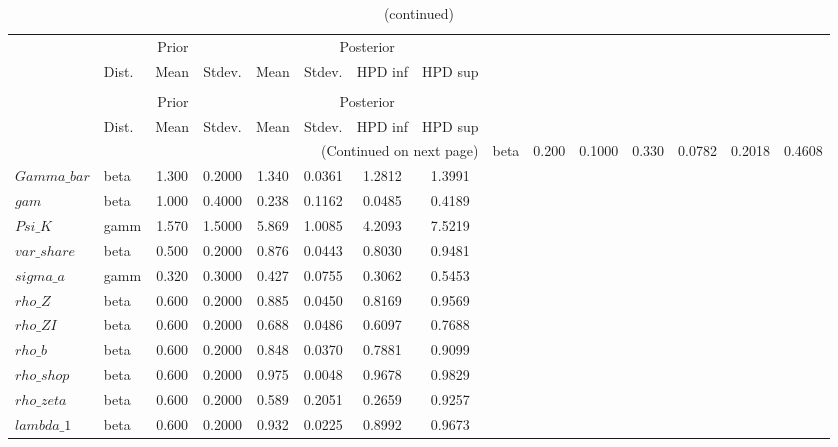  
\begin{center}
\begin{longtable}{llcccccc} 
\caption{Results from Metropolis-Hastings (parameters)}
 \label{Table:MHPosterior:1}\\
\toprule 
  & \multicolumn{3}{c}{Prior}  &  \multicolumn{4}{c}{Posterior} \\
  \cmidrule(r{.75em}){2-4} \cmidrule(r{.75em}){5-8}
  & Dist. & Mean  & Stdev. & Mean & Stdev. & HPD inf & HPD sup\\
\midrule \endfirsthead 
\caption{(continued)}\\\toprule 
  & \multicolumn{3}{c}{Prior}  &  \multicolumn{4}{c}{Posterior} \\
  \cmidrule(r{.75em}){2-4} \cmidrule(r{.75em}){5-8}
  & Dist. & Mean  & Stdev. & Mean & Stdev. & HPD inf & HPD sup\\
\midrule \endhead 
\bottomrule \multicolumn{8}{r}{(Continued on next page)} \endfoot 
\bottomrule \endlastfoot 
$Psi$ & beta &   0.200 & 0.1000 &   0.330& 0.0782 &  0.2018 &  0.4608 \\ 
$Gamma\_bar$ & beta &   1.300 & 0.2000 &   1.340& 0.0361 &  1.2812 &  1.3991 \\ 
$gam$ & beta &   1.000 & 0.4000 &   0.238& 0.1162 &  0.0485 &  0.4189 \\ 
$Psi\_K$ & gamm &   1.570 & 1.5000 &   5.869& 1.0085 &  4.2093 &  7.5219 \\ 
$var\_share$ & beta &   0.500 & 0.2000 &   0.876& 0.0443 &  0.8030 &  0.9481 \\ 
$sigma\_a$ & gamm &   0.320 & 0.3000 &   0.427& 0.0755 &  0.3062 &  0.5453 \\ 
$rho\_Z$ & beta &   0.600 & 0.2000 &   0.885& 0.0450 &  0.8169 &  0.9569 \\ 
$rho\_ZI$ & beta &   0.600 & 0.2000 &   0.688& 0.0486 &  0.6097 &  0.7688 \\ 
$rho\_b$ & beta &   0.600 & 0.2000 &   0.848& 0.0370 &  0.7881 &  0.9099 \\ 
$rho\_shop$ & beta &   0.600 & 0.2000 &   0.975& 0.0048 &  0.9678 &  0.9829 \\ 
$rho\_zeta$ & beta &   0.600 & 0.2000 &   0.589& 0.2051 &  0.2659 &  0.9257 \\ 
$lambda\_1$ & beta &   0.600 & 0.2000 &   0.932& 0.0225 &  0.8992 &  0.9673 \\ 
\end{longtable}
 \end{center}
